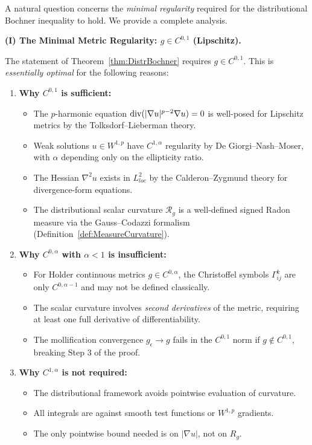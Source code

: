 \begin{remark}\label{rem:BochnerRegularity}
A natural question concerns the \emph{minimal regularity} required for the distributional Bochner inequality to hold. We provide a complete analysis.

\textbf{(I) The Minimal Metric Regularity: $g \in C^{0,1}$ (Lipschitz).}

The statement of Theorem~\ref{thm:DistrBochner} requires $g \in C^{0,1}$. This is \emph{essentially optimal} for the following reasons:

\begin{enumerate}
    \item \textbf{Why $C^{0,1}$ is sufficient:}
    \begin{itemize}
        \item The $p$-harmonic equation $\mathrm{div}(|\nabla u|^{p-2} \nabla u) = 0$ is well-posed for Lipschitz metrics by the Tolksdorf--Lieberman theory.
        \item Weak solutions $u \in W^{1,p}$ have $C^{1,\alpha}$ regularity by De Giorgi--Nash--Moser, with $\alpha$ depending only on the ellipticity ratio.
        \item The Hessian $\nabla^2 u$ exists in $L^2_{loc}$ by the Calderon--Zygmund theory for divergence-form equations.
        \item The distributional scalar curvature $\mathcal{R}_g$ is a well-defined signed Radon measure via the Gauss--Codazzi formalism (Definition~\ref{def:MeasureCurvature}).
    \end{itemize}
    
    \item \textbf{Why $C^{0,\alpha}$ with $\alpha < 1$ is insufficient:}
    \begin{itemize}
        \item For Holder continuous metrics $g \in C^{0,\alpha}$, the Christoffel symbols $\Gamma^k_{ij}$ are only $C^{0,\alpha-1}$ and may not be defined classically.
        \item The scalar curvature involves \emph{second derivatives} of the metric, requiring at least one full derivative of differentiability.
        \item The mollification convergence $g_\epsilon \to g$ fails in the $C^{0,1}$ norm if $g \notin C^{0,1}$, breaking Step 3 of the proof.
    \end{itemize}
    
    \item \textbf{Why $C^{1,\alpha}$ is not required:}
    \begin{itemize}
        \item The distributional framework avoids pointwise evaluation of curvature.
        \item All integrals are against smooth test functions or $W^{1,p}$ gradients.
        \item The only pointwise bound needed is on $|\nabla u|$, not on $R_g$.
    \end{itemize}
\end{enumerate}


\end{remark}
